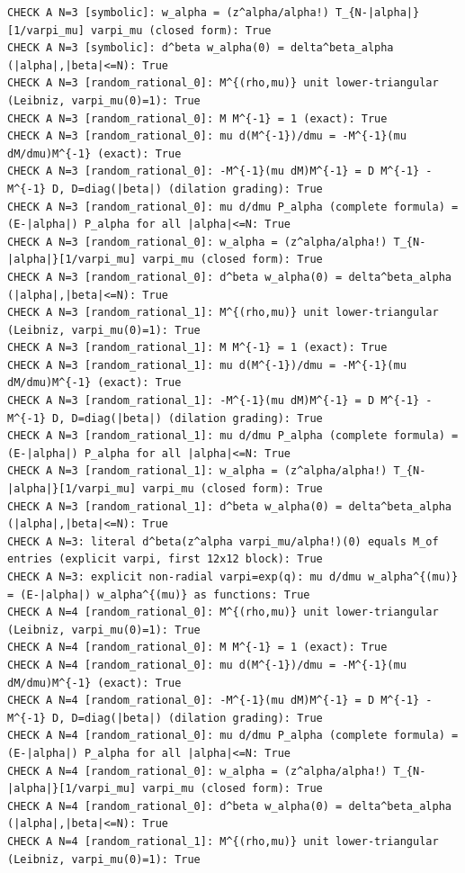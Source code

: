 \documentclass{article}
\theoremstyle{remark}
\begin{document}
\begin{lstlisting}
CHECK A N=3 [symbolic]: w_alpha = (z^alpha/alpha!) T_{N-|alpha|}[1/varpi_mu] varpi_mu (closed form): True
CHECK A N=3 [symbolic]: d^beta w_alpha(0) = delta^beta_alpha (|alpha|,|beta|<=N): True
CHECK A N=3 [random_rational_0]: M^{(rho,mu)} unit lower-triangular (Leibniz, varpi_mu(0)=1): True
CHECK A N=3 [random_rational_0]: M M^{-1} = 1 (exact): True
CHECK A N=3 [random_rational_0]: mu d(M^{-1})/dmu = -M^{-1}(mu dM/dmu)M^{-1} (exact): True
CHECK A N=3 [random_rational_0]: -M^{-1}(mu dM)M^{-1} = D M^{-1} - M^{-1} D, D=diag(|beta|) (dilation grading): True
CHECK A N=3 [random_rational_0]: mu d/dmu P_alpha (complete formula) = (E-|alpha|) P_alpha for all |alpha|<=N: True
CHECK A N=3 [random_rational_0]: w_alpha = (z^alpha/alpha!) T_{N-|alpha|}[1/varpi_mu] varpi_mu (closed form): True
CHECK A N=3 [random_rational_0]: d^beta w_alpha(0) = delta^beta_alpha (|alpha|,|beta|<=N): True
CHECK A N=3 [random_rational_1]: M^{(rho,mu)} unit lower-triangular (Leibniz, varpi_mu(0)=1): True
CHECK A N=3 [random_rational_1]: M M^{-1} = 1 (exact): True
CHECK A N=3 [random_rational_1]: mu d(M^{-1})/dmu = -M^{-1}(mu dM/dmu)M^{-1} (exact): True
CHECK A N=3 [random_rational_1]: -M^{-1}(mu dM)M^{-1} = D M^{-1} - M^{-1} D, D=diag(|beta|) (dilation grading): True
CHECK A N=3 [random_rational_1]: mu d/dmu P_alpha (complete formula) = (E-|alpha|) P_alpha for all |alpha|<=N: True
CHECK A N=3 [random_rational_1]: w_alpha = (z^alpha/alpha!) T_{N-|alpha|}[1/varpi_mu] varpi_mu (closed form): True
CHECK A N=3 [random_rational_1]: d^beta w_alpha(0) = delta^beta_alpha (|alpha|,|beta|<=N): True
CHECK A N=3: literal d^beta(z^alpha varpi_mu/alpha!)(0) equals M_of entries (explicit varpi, first 12x12 block): True
CHECK A N=3: explicit non-radial varpi=exp(q): mu d/dmu w_alpha^{(mu)} = (E-|alpha|) w_alpha^{(mu)} as functions: True
CHECK A N=4 [random_rational_0]: M^{(rho,mu)} unit lower-triangular (Leibniz, varpi_mu(0)=1): True
CHECK A N=4 [random_rational_0]: M M^{-1} = 1 (exact): True
CHECK A N=4 [random_rational_0]: mu d(M^{-1})/dmu = -M^{-1}(mu dM/dmu)M^{-1} (exact): True
CHECK A N=4 [random_rational_0]: -M^{-1}(mu dM)M^{-1} = D M^{-1} - M^{-1} D, D=diag(|beta|) (dilation grading): True
CHECK A N=4 [random_rational_0]: mu d/dmu P_alpha (complete formula) = (E-|alpha|) P_alpha for all |alpha|<=N: True
CHECK A N=4 [random_rational_0]: w_alpha = (z^alpha/alpha!) T_{N-|alpha|}[1/varpi_mu] varpi_mu (closed form): True
CHECK A N=4 [random_rational_0]: d^beta w_alpha(0) = delta^beta_alpha (|alpha|,|beta|<=N): True
CHECK A N=4 [random_rational_1]: M^{(rho,mu)} unit lower-triangular (Leibniz, varpi_mu(0)=1): True

\end{lstlisting}
\end{document}
